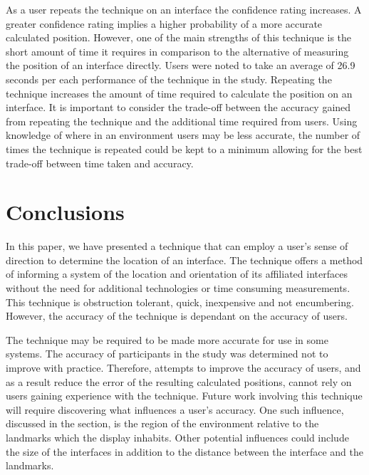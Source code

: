 \documentclass{bmcart}
\begin{document}
As a user repeats the technique on an interface the confidence rating increases.
A greater confidence rating implies a higher probability of a more accurate calculated position.
However, one of the main strengths of this technique is the short amount of time it requires in comparison to the alternative of measuring the position of an interface directly.
Users were noted to take an average of 26.9 seconds per each performance of the technique in the study.
Repeating the technique increases the amount of time required to calculate the position on an interface.
It is important to consider the trade-off between the accuracy gained from repeating the technique and the additional time required from users.
Using knowledge of where in an environment users may be less accurate, the number of times the technique is repeated could be kept to a minimum allowing for the best trade-off between time taken and accuracy.


\section*{Conclusions}\label{sec:conclusion}

In this paper, we have presented a technique that can employ a user's sense of direction to determine the location of an interface.
The technique offers a method of informing a system of the location and orientation of its affiliated interfaces without the need for additional technologies or time consuming measurements. 
This technique is obstruction tolerant, quick, inexpensive and not encumbering.
However, the accuracy of the technique is dependant on the accuracy of users.

The technique may be required to be made more accurate for use in some systems.
The accuracy of participants in the study was determined not to improve with practice.
Therefore, attempts to improve the accuracy of users, and as a result reduce the error of the resulting calculated positions, cannot rely on users gaining experience with the technique.
Future work involving this technique will require discovering what influences a user's accuracy.
One such influence, discussed in the  section, is the region of the environment relative to the landmarks which the display inhabits.
Other potential influences could include the size of the interfaces in addition to the distance between the interface and the landmarks.
\end{document}
